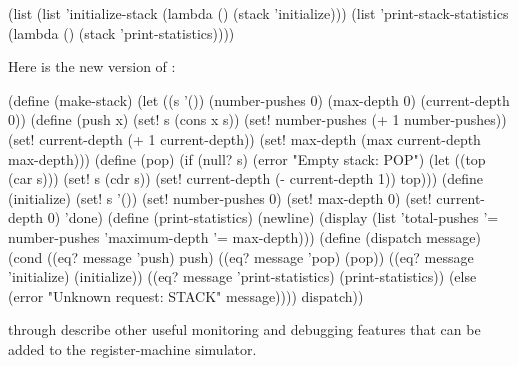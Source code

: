 \begin{codeBlock}
(list (list 'initialize-stack
            (lambda () (stack 'initialize)))
      (list 'print-stack-statistics
            (lambda () (stack 'print-statistics))))
\end{codeBlock}

\noindent
Here is the new version of :

\begin{codeBlock}
(define (make-stack)
  (let ((s '())
        (number-pushes 0)
        (max-depth 0)
        (current-depth 0))
    (define (push x)
      (set! s (cons x s))
      (set! number-pushes (+ 1 number-pushes))
      (set! current-depth (+ 1 current-depth))
      (set! max-depth (max current-depth max-depth)))
    (define (pop)
      (if (null? s)
          (error "Empty stack: POP")
          (let ((top (car s)))
            (set! s (cdr s))
            (set! current-depth (- current-depth 1))
            top)))
    (define (initialize)
      (set! s '())
      (set! number-pushes 0)
      (set! max-depth 0)
      (set! current-depth 0)
      'done)
    (define (print-statistics)
      (newline)
      (display (list 'total-pushes '= number-pushes
                     'maximum-depth '= max-depth)))
    (define (dispatch message)
      (cond ((eq? message 'push) push)
            ((eq? message 'pop) (pop))
            ((eq? message 'initialize) (initialize))
            ((eq? message 'print-statistics)
             (print-statistics))
            (else (error "Unknown request: STACK"
                         message))))
    dispatch))
\end{codeBlock}

\noindent
{} through  describe other useful
monitoring and debugging features that can be added to the register-machine
simulator.

